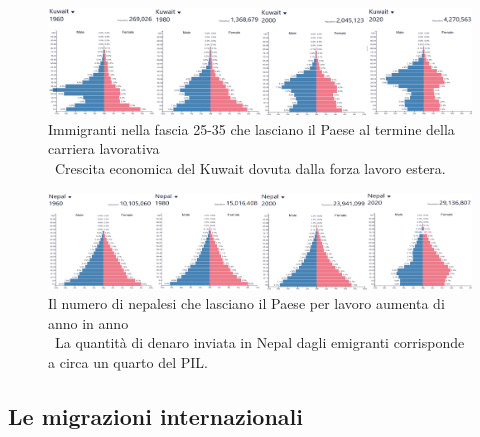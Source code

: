 \documentclass{article}
\begin{document}
\begin{figure}[ht!]
    \centering
    \includegraphics[width=1\textwidth]{media/demo_kuwait.png}
    \caption*{Immigranti nella fascia 25-35 che lasciano il Paese al termine della
        carriera lavorativa\\ \textrightarrow\ Crescita economica del Kuwait dovuta dalla forza
        lavoro estera.}
\end{figure}
\pagebreak
\begin{figure}[ht!]
    \centering
    \includegraphics[width=1\textwidth]{media/demo_nepal.png}
    \caption*{Il numero di nepalesi che lasciano il Paese per lavoro aumenta di anno in anno\\
    \textrightarrow\ La quantità di denaro inviata in Nepal dagli emigranti corrisponde a
    circa un quarto del PIL.}
\end{figure}

\subsection{Le migrazioni internazionali}
\end{document}

